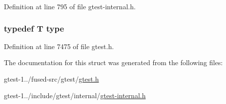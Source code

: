 \-Definition at line 795 of file gtest-\/internal.\-h.

\hypertarget{structtesting_1_1internal_1_1RemoveConst_3_01const_01T_01_4_a565429e62c1d4fd084335146ba778e17}{
\subsubsection[{type}]{\setlength{\rightskip}{0pt plus 5cm}typedef \-T {\bf type}}}\label{d4/de8/structtesting_1_1internal_1_1RemoveConst_3_01const_01T_01_4_a565429e62c1d4fd084335146ba778e17}


\-Definition at line 7475 of file gtest.\-h.



\-The documentation for this struct was generated from the following files\-:\begin{DoxyCompactItemize}
\item 
gtest-\/1../fused-\/src/gtest/\hyperlink{fused-src_2gtest_2gtest_8h}{gtest.\-h}\item 
gtest-\/1../include/gtest/internal/\hyperlink{gtest-internal_8h}{gtest-\/internal.\-h}\end{DoxyCompactItemize}
